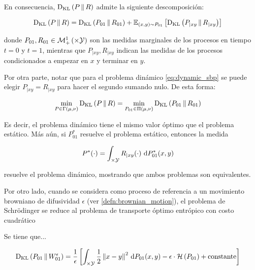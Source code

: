En consecuencia, $\operatorname{D_{KL}}\left(P\,\|\,R\right)$ admite la siguiente descomposición:

\begin{equation*}
	\operatorname{D_{KL}}\left(P\,\|\,R\right) = \operatorname{D_{KL}}\left(P_{01}\,\|\,R_{01}\right) + \mathbb{E}_{(x,y)\sim P_{01}}\left[\operatorname{D_{KL}}\left(P_{|xy}\,\|\,R_{|xy}\right)\right]
\end{equation*}

donde $P_{01},R_{01}\in\probmeasure{\xspace\times\yspace}$ son las medidas marginales de los procesos en tiempo $t=0$ y $t=1$, mientras que $P_{|xy}, R_{|xy}$ indican las medidas de los procesos condicionados a empezar en $x$ y terminar en $y$.

Por otra parte, notar que para el problema dinámico \eqref{eq:dynamic_sbp} se puede elegir $P_{|xy}=R_{|xy}$ para hacer el segundo sumando nulo. De esta forma:

\begin{equation*}
	\min_{P\in\Gamma(\mu,\nu)} \operatorname{D_{KL}}\left(P\,\|\,R\right) = \min_{P_{01}\in\Pi(\mu,\nu)} \operatorname{D_{KL}}\left(P_{01}\,\|\,R_{01}\right)
\end{equation*}

Es decir, el problema dinámico tiene el mismo valor óptimo que el problema estático. Más aún, si $P_{01}^*$ resuelve el problema estático, entonces la medida

\begin{equation*}
	P^*(\cdot) = \int_{\times\mathcal{Y}} R_{|xy}(\cdot) \,\operatorname{d}\! P_{01}^*(x,y)
\end{equation*}

resuelve el problema dinámico, mostrando que ambos problemas son equivalentes.

Por otro lado, cuando se considera como proceso de referencia a un movimiento browniano de difusividad $\epsilon$ (ver \autoref{defn:brownian_motion}), el problema de Schrödinger se reduce al problema de transporte óptimo entrópico con costo cuadrático

\begin{prop}
	Se tiene que...

	\begin{equation*}
		\KL{P_{01}}{W_{01}^\epsilon} = 
		\frac{1}{\epsilon}\rparent{\int_{\xspace\times\yspace} \frac{1}{2} \norm{x-y}^2 \d P_{01}(x,y) - \epsilon\cdot\entropy{P_{01}} + \cte}
	\end{equation*}

\end{prop}

